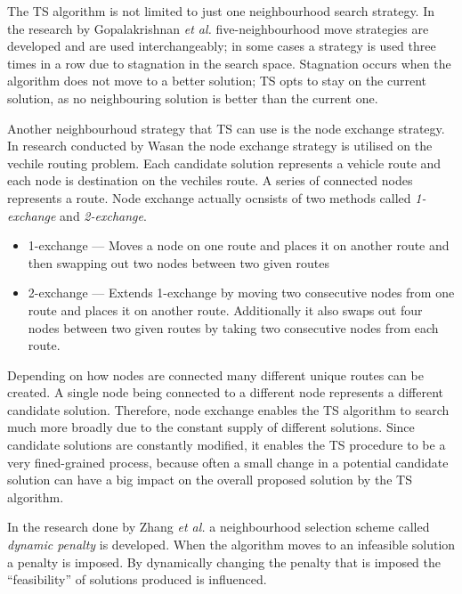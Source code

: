 The \gls{TS} algorithm is not limited to just one neighbourhood search strategy. In the research by Gopalakrishnan \emph{et al.}\cite{TabuCarryOver} five-neighbourhood move strategies are developed and are used interchangeably; in some cases a strategy is used three times in a row due to stagnation in the search space. Stagnation occurs when the algorithm does not move to a better solution; \gls{TS} opts to stay on the current solution, as no neighbouring solution is better than the current one. 

Another neighbourhoud strategy that \gls{TS} can use is the node exchange strategy. In research conducted by Wasan the node exchange strategy is utilised on the vechile routing problem. Each candidate solution represents a vehicle route and each node is destination on the vechiles route. A series of connected nodes represents a route. Node exchange actually ocnsists of two methods called \emph{1-exchange} and \emph{2-exchange}\cite{ReactiveTabuVHR}.
\begin{itemize}
\item{1-exchange} --- Moves a node on one route and places it on another route and then swapping out two nodes between two given routes\cite{ReactiveTabuVHR}
\item{2-exchange} --- Extends 1-exchange by moving two consecutive nodes from one route and places it on another route. Additionally it also swaps out four nodes between two given routes by taking two consecutive nodes from each route\cite{ReactiveTabuVHR}.
\end{itemize}

Depending on how nodes are connected many different unique routes can be created. A single node being connected to a different node represents a different candidate solution. Therefore, node exchange enables the \gls{TS} algorithm to search much more broadly due to the constant supply of different solutions. Since candidate solutions are constantly modified, it enables the \gls{TS} procedure to be a very fined-grained process, because often a small change in a potential candidate solution can have a big impact on the overall proposed solution by the \gls{TS} algorithm.

In the research done by Zhang \emph{et al.}\cite{TSHazardous} a neighbourhood selection scheme called \emph{dynamic penalty} is developed. When the algorithm moves to an infeasible solution a penalty is imposed. By dynamically changing the penalty that is imposed the ``feasibility'' of solutions produced is influenced. 

